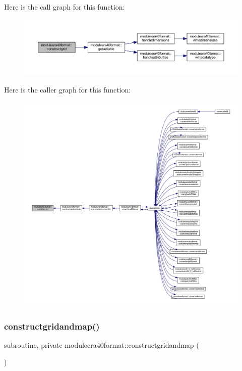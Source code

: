 Here is the call graph for this function\+:\nopagebreak
\begin{figure}[H]
\begin{center}
\leavevmode
\includegraphics[width=350pt]{namespacemoduleera40format_ad847a1e5d762ac9c9f77372614efda16_cgraph}
\end{center}
\end{figure}
Here is the caller graph for this function\+:\nopagebreak
\begin{figure}[H]
\begin{center}
\leavevmode
\includegraphics[width=350pt]{namespacemoduleera40format_ad847a1e5d762ac9c9f77372614efda16_icgraph}
\end{center}
\end{figure}
\mbox{\label{namespacemoduleera40format_ad4271c51cd4bfc71c5ed5743a60e7fef}} 
\subsubsection{\texorpdfstring{constructgridandmap()}{constructgridandmap()}}
{\footnotesize\ttfamily subroutine, private moduleera40format\+::constructgridandmap (\begin{DoxyParamCaption}{ }\end{DoxyParamCaption})\hspace{0.3cm}{\ttfamily [private]}}

